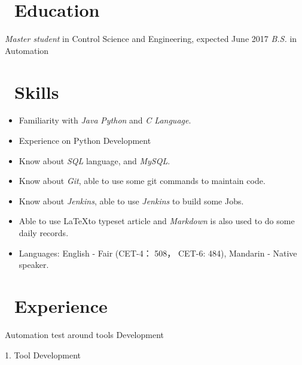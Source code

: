 \documentclass{resume}
\begin{document}


 
\section{\faGraduationCap\ Education}
\textit{Master student} in Control Science and Engineering, expected June 2017
\textit{B.S.} in Automation


\section{\faCogs\ Skills}
\begin{itemize}[parsep=1ex]
  \item Familiarity with \emph{Java} \emph{Python} and \emph{C Language}.
  \item Experience on Python Development
  \item Know about \emph{SQL} language, and \emph{MySQL}.
  \item Know about \emph{Git}, able to use some git commands to maintain code.
  \item Know about \emph{Jenkins}, able to use \emph{Jenkins} to build some Jobs.
  \item Able to use \LaTeX   to typeset article and \emph{Markdown} is also used to do some daily records.
  \item Languages: English - Fair (CET-4： 508， CET-6: 484), Mandarin - Native speaker.
\end{itemize}

\section{\faUsers\ Experience}
Automation test around tools Development

1. Tool Development
\end{document}
